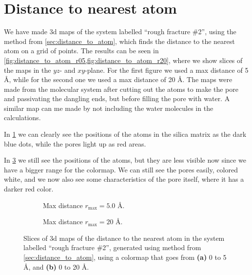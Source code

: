 \section{Distance to nearest atom}
%
We have made 3d maps of the system labelled ``rough fracture \#2'', using the method from \cref{sec:distance_to_atom}, which finds the distance to the nearest atom on a grid of points. The results can be seen in \cref{fig:distance_to_atom_r05,fig:distance_to_atom_r20}, where we show slices of the maps in the $yz$- and $xy$-plane. For the first figure we used a max distance of 5 \AA, while for the second one we used a max distance of 20 \AA. The maps were made from the molecular system after cutting out the atoms to make the pore and passivating the dangling ends, but before filling the pore with water. A similar map can me made by not including the water molecules in the calculations.

In \cref{fig:distance_to_atom_r05} we can clearly see the positions of the atoms in the silica matrix as the dark blue dots, while the pores light up as red areas.

In \cref{fig:distance_to_atom_r20} we still see the positions of the atoms, but they are less visible now since we have a bigger range for the colormap. We can still see the pores easily, colored white, and we now also see some characteristics of the pore itself, where it has a darker red color.%
%
\begin{figure}[!p]%
    \centering%
    \setlength{\myfigwidth}{\textwidth}%
    \begin{subfigure}[b]{\myfigwidth}%
        \caption{Max distance $r_\text{max}=5.0$ \AA.%
        \label{fig:distance_to_atom_r05}}%
    \end{subfigure}%
    \vspace{10pt}
    \begin{subfigure}[b]{\myfigwidth}%
        \caption{Max distance $r_\text{max}=20$ \AA.%
        \label{fig:distance_to_atom_r20}}%
    \end{subfigure}%
    \captionsetup{width=\textwidth}%
    \caption{%
        Slices of 3d maps of the distance to the nearest atom in the system labelled ``rough fracture \#2'', generated using method from \cref{sec:distance_to_atom}, using a colormap that goes from \textbf{(a)} 0 to 5 \AA, and \textbf{(b)} 0 to 20 \AA.%
    }%
\end{figure}%